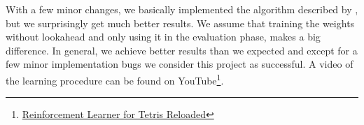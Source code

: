 \documentclass{ml}
\begin{document}
With a few minor changes, we basically implemented the algorithm described by \cite{zucker2009learning}, but we surprisingly get much better results. 
We assume that training the weights without lookahead and only using it in the evaluation phase, makes a big difference. 
In general, we achieve better results than we expected and except for a few minor implementation bugs we consider this project as successful.
A video of the learning procedure can be found on YouTube\footnote{\href{http://www.youtube.com/watch?v=DXgtzFiRHdc}{Reinforcement Learner for Tetris Reloaded}}.



\newpage

%

\end{document}
